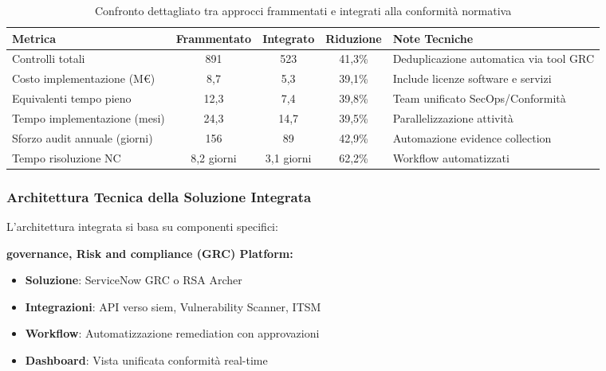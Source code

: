 \begin{table}[h]
\centering
\caption{Confronto dettagliato tra approcci frammentati e integrati alla conformità normativa}
\label{tab:confronto_compliance}
\begin{tabular}{|l|c|c|c|p{4cm}|}
\hline
\textbf{Metrica} & \textbf{Frammentato} & \textbf{Integrato} & \textbf{Riduzione} & \textbf{Note Tecniche} \\
\hline
Controlli totali & 891 & 523 & 41,3\% & Deduplicazione automatica via tool GRC \\
Costo implementazione (M€) & 8,7 & 5,3 & 39,1\% & Include licenze software e servizi \\
Equivalenti tempo pieno & 12,3 & 7,4 & 39,8\% & Team unificato SecOps/Conformità \\
Tempo implementazione (mesi) & 24,3 & 14,7 & 39,5\% & Parallelizzazione attività \\
Sforzo audit annuale (giorni) & 156 & 89 & 42,9\% & Automazione evidence collection \\
Tempo risoluzione NC & 8,2 giorni & 3,1 giorni & 62,2\% & Workflow automatizzati \\
\hline
\end{tabular}
\end{table}

\subsubsection{\texorpdfstring{Architettura Tecnica della Soluzione Integrata}{4.3.2.2 - Architettura Tecnica della Soluzione Integrata}}

L'architettura integrata si basa su componenti specifici:

\textbf{\gls{governance}, Risk and \gls{compliance} (GRC) Platform:}
\begin{itemize}
    \item \textbf{Soluzione}: ServiceNow GRC o RSA Archer
    \item \textbf{Integrazioni}: API verso \gls{siem}, Vulnerability Scanner, ITSM
    \item \textbf{Workflow}: Automatizzazione remediation con approvazioni
    \item \textbf{Dashboard}: Vista unificata conformità real-time
\end{itemize}

